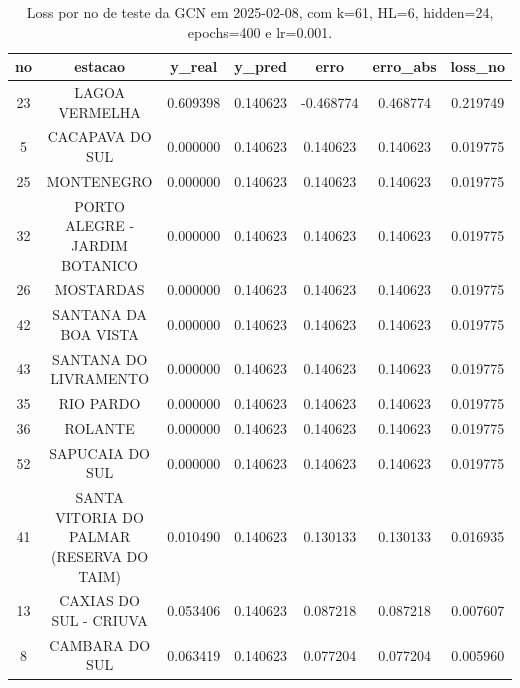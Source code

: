 \begin{table}[h]
\centering
\caption{Loss por no de teste da GCN em 2025-02-08, com k=61, HL=6, hidden=24, epochs=400 e lr=0.001.}
\label{tab:gcn_loss_k61_hl6_h24_e400_d20250208}
\begin{tabular}{ccccccc}
\toprule
no & estacao & y\_real & y\_pred & erro & erro\_abs & loss\_no \\
\midrule
23 & LAGOA VERMELHA & 0.609398 & 0.140623 & -0.468774 & 0.468774 & 0.219749 \\
5 & CACAPAVA DO SUL & 0.000000 & 0.140623 & 0.140623 & 0.140623 & 0.019775 \\
25 & MONTENEGRO & 0.000000 & 0.140623 & 0.140623 & 0.140623 & 0.019775 \\
32 & PORTO ALEGRE - JARDIM BOTANICO & 0.000000 & 0.140623 & 0.140623 & 0.140623 & 0.019775 \\
26 & MOSTARDAS & 0.000000 & 0.140623 & 0.140623 & 0.140623 & 0.019775 \\
42 & SANTANA DA BOA VISTA & 0.000000 & 0.140623 & 0.140623 & 0.140623 & 0.019775 \\
43 & SANTANA DO LIVRAMENTO & 0.000000 & 0.140623 & 0.140623 & 0.140623 & 0.019775 \\
35 & RIO PARDO & 0.000000 & 0.140623 & 0.140623 & 0.140623 & 0.019775 \\
36 & ROLANTE & 0.000000 & 0.140623 & 0.140623 & 0.140623 & 0.019775 \\
52 & SAPUCAIA DO SUL & 0.000000 & 0.140623 & 0.140623 & 0.140623 & 0.019775 \\
41 & SANTA VITORIA DO PALMAR (RESERVA DO TAIM) & 0.010490 & 0.140623 & 0.130133 & 0.130133 & 0.016935 \\
13 & CAXIAS DO SUL - CRIUVA & 0.053406 & 0.140623 & 0.087218 & 0.087218 & 0.007607 \\
8 & CAMBARA DO SUL & 0.063419 & 0.140623 & 0.077204 & 0.077204 & 0.005960 \\
\bottomrule
\end{tabular}
\end{table}
